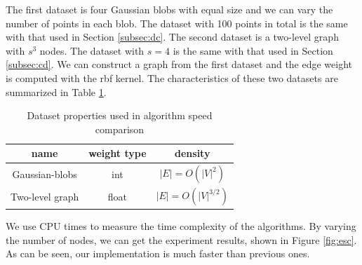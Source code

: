 The first dataset is four Gaussian blobs with equal size and we can vary the number of points in each blob. The dataset with 100 points in total is the same with that used in 
Section \ref{subsec:dc}. The second dataset is a two-level graph with $s^3$ nodes. The dataset with $s=4$ is the same with that used in Section \ref{subsec:cd}.
We can construct a graph from the first dataset and the edge weight is computed with the rbf kernel. The characteristics of these two datasets are summarized in
Table \ref{tab:alg_compare}.
\begin{table}[!ht]
\centering
\begin{tabular}{ccc}
\hline
name & weight type & density \\
\hline
Gaussian-blobs & int & $|E|=O(|V|^2)$\\
Two-level graph & float & $|E|=O(|V|^{3/2})$\\
\hline
\end{tabular}
\caption{Dataset properties used in algorithm speed comparison} \label{tab:alg_compare}
\end{table}
We use CPU times to measure the time complexity of the algorithms. By varying the number of nodes, we can get the experiment results, shown in Figure \ref{fig:esc}.
As can be seen, our implementation is much faster than previous ones.

